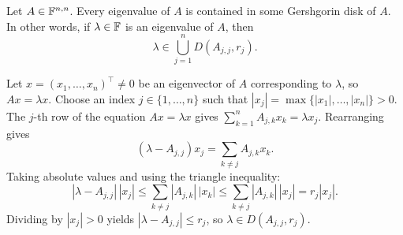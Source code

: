 \begin{thm}
  \label{thm: gershgorin disk theorem}
  Let $A \in \mathbb{F}^{n,n}$. Every eigenvalue of $A$ is contained in some Gershgorin disk of $A$. In other words, if $\lambda \in \mathbb{F}$ is an eigenvalue of $A$, then
  \begin{equation}
    \lambda \in \bigcup_{j=1}^n D(A_{j,j}, r_j).
  \end{equation}
\end{thm}
\begin{prf}
  Let $x = (x_1, \dots, x_n)^\top \neq 0$ be an eigenvector of $A$ corresponding to $\lambda$, so $Ax = \lambda x$.
  Choose an index $j \in \{1, \dots, n\}$ such that $|x_j| = \max \{|x_1|, \dots, |x_n|\} > 0$.
  The $j$-th row of the equation $Ax = \lambda x$ gives $\sum_{k=1}^n A_{j,k} x_k = \lambda x_j$.
  Rearranging gives
  \begin{equation}
    (\lambda - A_{j,j}) x_j = \sum_{k \neq j} A_{j,k} x_k.
  \end{equation}
  Taking absolute values and using the triangle inequality:
  \begin{equation}
    |\lambda - A_{j,j}| \, |x_j| \leq \sum_{k \neq j} |A_{j,k}| \, |x_k| \leq \sum_{k \neq j} |A_{j,k}| \, |x_j| = r_j |x_j|.
  \end{equation}
  Dividing by $|x_j| > 0$ yields $|\lambda - A_{j,j}| \leq r_j$, so $\lambda \in D(A_{j,j}, r_j)$.
\end{prf}
